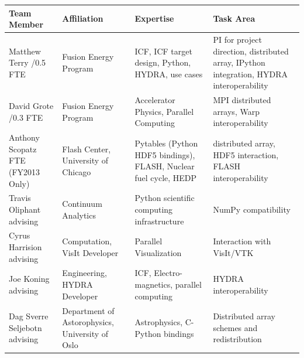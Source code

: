 \documentclass[letterpaper,11pt]{article}
\newlength{\DUtablewidth} %
\begin{document}
\setlength{\DUtablewidth}{\linewidth}
\begin{longtable*}[c]
	{|p{0.187\DUtablewidth}|p{0.251\DUtablewidth}|p{0.260\DUtablewidth}|p{0.251\DUtablewidth}|}
	\hline
	\textbf{Team Member} & \textbf{Affiliation} & \textbf{Expertise} & \textbf{Task Area} \\
	\endfirsthead
	\hline

	Matthew Terry /0.5 FTE &
	Fusion Energy Program &
	ICF, ICF target design, Python, HYDRA, use cases &
	PI for project direction,
	distributed array, IPython integration, HYDRA interoperability \\
	\hline

	David Grote /0.3 FTE &
	Fusion Energy Program &
	Accelerator Physics, Parallel Computing &
	MPI distributed arrays, Warp interoperability \\
	\hline

	Anthony Scopatz  FTE (FY2013 Only) &
	Flash Center, \newline
	University of Chicago &
	Pytables (Python HDF5 bindings), FLASH, Nuclear fuel cycle, HEDP &
	distributed array, HDF5 interaction, FLASH interoperability \\
	\hline

	Travis Oliphant \newline
	advising &
	Continuum Analytics &
	Python scientific computing infrastructure &
	NumPy compatibility \\
	\hline

	Cyrus Harrision \newline
	advising &
	Computation, \newline
	VisIt Developer &
	Parallel Visualization &
	Interaction with VisIt/VTK  \\
	\hline

	Joe Koning \newline
	advising &
	Engineering, \newline
	HYDRA Developer & 
	ICF, Electro-magnetics, parallel computing & 
	HYDRA interoperability \\
	\hline

	Dag Sverre Seljebotn \newline
	advising &
	Department of Astorophysics, \newline
	University of Oslo &
	Astrophysics, C-Python bindings &
	Distributed array schemes and redistribution \\
	\hline
\end{longtable*}

\newpage



\end{document}
